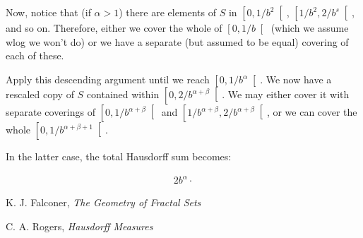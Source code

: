 \documentclass[11pt]{amsart}
\begin{document}
Now, notice that (if $\alpha > 1$) there are elements of $S$ in $\left[0, 1/b^2 \right[$, $\left[1/b^2, 2/b^s \right[$, and so on. Therefore, either we cover the whole of $\left[0, 1/b \right[$ (which we assume wlog we won't do) or we have a separate (but assumed to be equal) covering of each of these.

Apply this descending argument until we reach $\left[0, 1/b^\alpha \right[$. We now have a rescaled copy of $S$ contained within $\left[0, 2/b^{\alpha + \beta}\right[$. We may either cover it with separate coverings of $\left[0, 1/b^{\alpha + \beta}\right[$ and $\left[1/b^{\alpha + \beta}, 2/b^{\alpha + \beta}\right[$, or we can cover the whole $\left[0, 1/b^{\alpha + \beta + 1}\right[$.

In the latter case, the total Hausdorff sum becomes:

\begin{align*}
2 b^\alpha \cdot
\end{align*}


\begin{thebibliography}{1}
K. J. Falconer, \textit{The Geometry of Fractal Sets}

C. A. Rogers, \textit{Hausdorff Measures}

\end{thebibliography}
\end{document}
